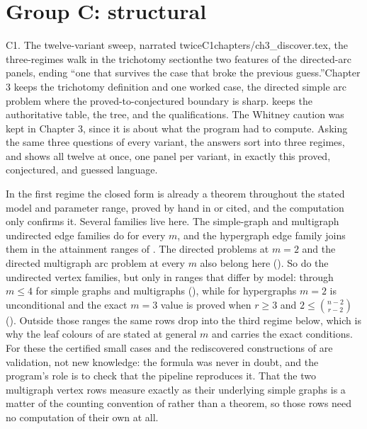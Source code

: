 \section*{Group C: structural}

\begin{offcutrewrite}{C1. The twelve-variant sweep, narrated twice}{C1}{chapters/ch3\_discover.tex, the three-regimes walk in the trichotomy section}{the two features of the directed-arc panels, ending ``one that survives the case that broke the previous guess.''}{Chapter 3 keeps the trichotomy definition and one worked case, the directed simple arc problem where the proved-to-conjectured boundary is sharp.  keeps the authoritative table, the tree, and the qualifications. The Whitney caution was kept in Chapter 3, since it is about what the program had to compute.}
Asking the same three questions of every variant, the answers sort into three regimes, and  shows all twelve at once, one panel per variant, in exactly this proved, conjectured, and guessed language.

In the first regime the closed form is already a theorem throughout the stated model and parameter range, proved by hand in  or cited, and the computation only confirms it. Several families live here. The simple-graph and multigraph undirected edge families do for every $m$, and the hypergraph edge family joins them in the attainment ranges of . The directed problems at $m = 2$ and the directed multigraph arc problem at every $m$ also belong here (). So do the undirected vertex families, but only in ranges that differ by model: through $m \le 4$ for simple graphs and multigraphs (), while for hypergraphs $m=2$ is unconditional and the exact $m=3$ value is proved when $r\ge3$ and $2\le\binom{n-2}{r-2}$ (). Outside those ranges the same rows drop into the third regime below, which is why the leaf colours of  are stated at general $m$ and  carries the exact conditions. For these the certified small cases and the rediscovered constructions of  are validation, not new knowledge: the formula was never in doubt, and the program's role is to check that the pipeline reproduces it. That the two multigraph vertex rows measure exactly as their underlying simple graphs is a matter of the counting convention of  rather than a theorem, so those rows need no computation of their own at all.


\end{offcutrewrite}
